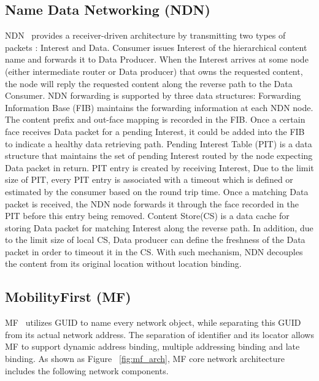 \subsection{Name Data Networking (NDN)}
NDN~\cite{zhang2014named} provides a receiver-driven architecture by transmitting two types of packets : Interest and Data. Consumer issues Interest of the hierarchical content name and forwards it to Data Producer. When the Interest arrives at some node (either intermediate router or Data producer) that owns the requested content, the node will reply the requested content along the reverse path to the Data Consumer.
NDN forwarding is supported by three data structures:
Forwarding Information Base (FIB) maintains the forwarding information at each NDN node. The content prefix and out-face mapping is recorded in the FIB. Once a certain face receives Data packet for a pending Interest,  it could be added into the FIB to indicate a healthy data retrieving path. Pending Interest Table (PIT) is a data structure that maintains the set of pending Interest routed by the node expecting Data packet in return. PIT entry is created by receiving Interest,
Due to the limit size of PIT, every PIT entry is associated with a timeout which is defined or estimated by the consumer based on the round trip time. Once a matching Data packet is received, the NDN node forwards it through the face recorded in the PIT before this entry being removed. Content Store(CS) is a data cache for storing Data packet for matching Interest along the reverse path. In addition, due to the limit size of local CS, Data producer can define the freshness of the Data packet in order to timeout it in the CS. With such mechanism,
NDN decouples the content from its original location without location binding.


\subsection{MobilityFirst (MF)}\label{sec:intro_mf}
MF~\cite{raychaudhuri2012mobilityfirst} utilizes GUID to name every network object, while separating this GUID from its actual network address. The separation of identifier and its locator allows MF to support dynamic address binding, multiple addressing binding and late binding. As shown as Figure ~\ref{fig:mf_arch}, MF core network architecture includes the following network components.

